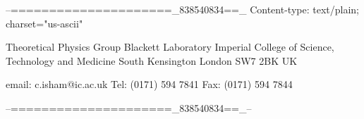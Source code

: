 --=====================_838540834==_
Content-type: text/plain; charset="us-ascii"


Theoretical Physics Group
Blackett Laboratory
Imperial College of Science, Technology and Medicine
South Kensington
London SW7 2BK
UK

email: c.isham@ic.ac.uk
Tel:  (0171) 594 7841
Fax:  (0171) 594 7844

--=====================_838540834==_--
